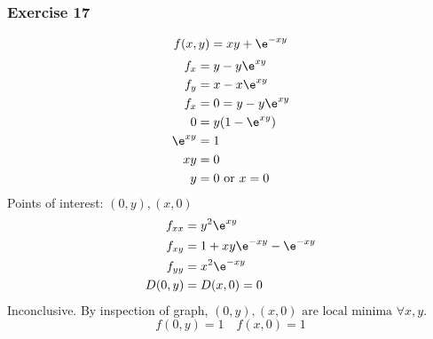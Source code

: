 \documentclass[letterpaper, 12pt]{math}
\begin{document}
\subsubsection*{Exercise 17}
\[ f(x,y) = xy+\e^{-xy} \]
\begin{align*}
  f_x &= y-y\e^{xy} \\
  f_y &= x-x\e^{xy} \\
  f_x &= 0 = y-y\e^{xy} \\
  0 &= y(1-\e^{xy}) \\
  \e^{xy} &= 1 \\
  xy &= 0 \\
  y &= 0 \text{ or } x = 0 \\
\end{align*}
Points of interest: \( (0,y), (x,0) \)
\begin{align*}
  f_{xx} &= y^2\e^{xy} \\
  f_{xy} &= 1+xy\e^{-xy}-\e^{-xy} \\
  f_{yy} &= x^2\e^{-xy} \\
  D(0,y) &= D(x,0) = 0
\end{align*}
Inconclusive. By inspection of graph, \( (0,y), (x,0) \text{ are local
minima }\forall x,y \).
\[ f(0,y) = 1 \quad f(x,0) = 1 \]
\end{document}
